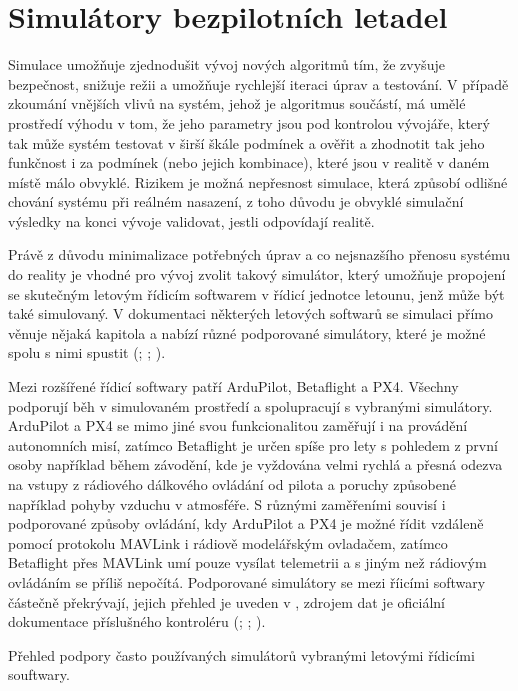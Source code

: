 \chapter{Simulátory bezpilotních letadel} \label{chap:sims}
    Simulace umožňuje zjednodušit vývoj nových algoritmů tím, že zvyšuje bezpečnost, snižuje režii a umožňuje rychlejší iteraci úprav a testování. V případě zkoumání vnějších vlivů na systém, jehož je algoritmus součástí, má umělé prostředí výhodu v tom, že jeho parametry jsou pod kontrolou vývojáře, který tak může systém testovat v širší škále podmínek a ověřit a zhodnotit tak jeho funkčnost i za podmínek (nebo jejich kombinace), které jsou v realitě v daném místě málo obvyklé. Rizikem je možná nepřesnost simulace, která způsobí odlišné chování systému při reálném nasazení, z toho důvodu je obvyklé simulační výsledky na konci vývoje validovat, jestli odpovídají realitě.

    Právě z důvodu minimalizace potřebných úprav a co nejsnazšího přenosu systému do reality je vhodné pro vývoj zvolit takový simulátor, který umožňuje propojení se skutečným letovým řídicím softwarem v řídicí jednotce letounu, jenž může být také simulovaný. V dokumentaci některých letových softwarů se simulaci přímo věnuje nějaká kapitola a nabízí různé podporované simulátory, které je možné spolu s nimi spustit (\cite{px4:simulation}; \cite{ardupilot:simulation}; \cite{betaflight:simulation}).

    Mezi rozšířené řídicí softwary patří ArduPilot, Betaflight a PX4. Všechny podporují běh v simulovaném prostředí a spolupracují s vybranými simulátory. ArduPilot a PX4 se mimo jiné svou funkcionalitou zaměřují i na provádění autonomních misí, zatímco Betaflight je určen spíše pro lety s pohledem z první osoby například během závodění, kde je vyždována velmi rychlá a přesná odezva na vstupy z rádiového dálkového ovládání od pilota a poruchy způsobené například pohyby vzduchu v atmosféře. S různými zaměřeními souvisí i podporované způsoby ovládání, kdy ArduPilot a PX4 je možné řídit vzdáleně pomocí protokolu MAVLink i rádiově modelářským ovladačem, zatímco Betaflight přes MAVLink umí pouze vysílat telemetrii a s jiným než rádiovým ovládáním se příliš nepočítá. Podporované simulátory se mezi říicími softwary částečně překrývají, jejich přehled je uveden v , zdrojem dat je oficiální dokumentace příslušného kontroléru (\cite{px4:simulation}; \cite{ardupilot:simulation}; \cite{betaflight:simulation}).

    \begin{table}
        \centering
        
        \caption[Simulátory podporované kontrolérem letounu]{Přehled podpory často používaných simulátorů vybranými letovými řídicími souftwary.}
        \label{tab:sims}
    \end{table}

